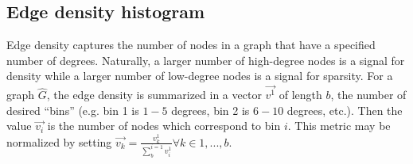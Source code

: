 \subsection{Edge density histogram}

Edge density captures the number of nodes in a graph that have a specified 
number of degrees. Naturally, a larger number of high-degree nodes is a signal 
for density while a larger number of low-degree nodes is a signal for sparsity.
For a graph $\hat{G}$, the edge density is summarized in a 
vector $\overrightarrow{v^1}$ of length $b$, the number of desired ``bins'' 
(e.g. bin 1 is $1-5$ degrees, bin 2 is $6-10$ degrees, etc.). Then the value 
$\overrightarrow{v_i}$ is the number of nodes which correspond to bin $i$. This 
metric may be normalized by setting
$\overrightarrow{v_k} = \frac{v^1_k}{\sum_{b}^{i=1} v^1_i} \forall k \in 
{1,...,b}$.

